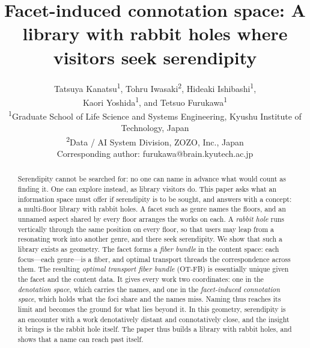 \documentclass[11pt,a4paper]{article}
\begin{document}
\title{Facet-induced connotation space: A library with rabbit holes where visitors seek serendipity}
\author{
    Tatsuya Kanatsu\textsuperscript{1}, Tohru Iwasaki\textsuperscript{2}, Hideaki Ishibashi\textsuperscript{1}, \\
    Kaori Yoshida\textsuperscript{1}, and Tetsuo Furukawa\textsuperscript{1} \\[3pt]
    \small \textsuperscript{1}Graduate School of Life Science and Systems Engineering, Kyushu Institute of Technology, Japan \\
    \small \textsuperscript{2}Data / AI System Division, ZOZO, Inc., Japan \\
    \small Corresponding author: furukawa@brain.kyutech.ac.jp
}
\author{} %
\date{}
\maketitle

\begin{abstract}\noindent
    Serendipity cannot be searched for: no one can name in advance what would
    count as finding it. One can explore instead, as library visitors do.
    This paper asks what an information space must offer if serendipity is to
    be sought, and answers with a concept: a multi-floor library with rabbit
    holes. A facet such as genre names the floors, and an unnamed aspect
    shared by every floor arranges the works on each. A \textit{rabbit hole}
    runs vertically through the same position on every floor, so that users
    may leap from a resonating work into another genre, and there seek
    serendipity.
    We show that such a library exists as geometry. The facet forms a
    \textit{fiber bundle} in the content space: each focus---each genre---is a
    fiber, and optimal transport threads the correspondence across them. The
    resulting \textit{optimal transport fiber bundle} (OT-FB) is essentially
    unique given the facet and the content data. It gives every work two
    coordinates: one in the \textit{denotation space}, which carries the names,
    and one in the \textit{facet-induced connotation space}, which holds what
    the foci share and the names miss. Naming thus reaches its limit and
    becomes the ground for what lies beyond it.
    In this geometry, serendipity is an encounter with a work denotatively
    distant and connotatively close, and the insight it brings is the rabbit
    hole itself. The paper thus builds a library with rabbit holes, and shows
    that a name can reach past itself.
\end{abstract}
\end{document}
